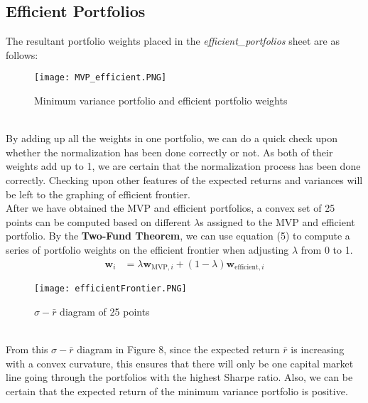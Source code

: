 \subsection{Efficient Portfolios}
The resultant portfolio weights placed in the \emph{efficient\_portfolios} sheet are as follows:
\begin{figure}[h]
	\centering
	\texttt{[image: MVP\_efficient.PNG]}
	\caption{Minimum variance portfolio and efficient portfolio weights}
\end{figure}
\\[6mm]By adding up all the weights in one portfolio, we can do a quick check upon whether the normalization has been done correctly or not. As both of their weights add up to 1, we are certain that the normalization process has been done correctly. Checking upon other features of the expected returns and variances will be left to the graphing of efficient frontier.\\
After we have obtained the MVP and efficient portfolios, a convex set of 25 points can be computed based on different $\lambda$s assigned to the MVP and efficient portfolio. By the \textbf{Two-Fund Theorem}, we can use equation (5) to compute a series of portfolio weights on the efficient frontier when adjusting $\lambda$ from 0 to 1.
\begin{equation}
\begin{split}
\textbf{w}_{i} &= \lambda \textbf{w}_{\text{MVP}, i} + (1 - \lambda) \textbf{w}_{\text{efficient}, i}
\end{split}
\end{equation}
\begin{figure}[h]
	\centering
	\texttt{[image: efficientFrontier.PNG]}
	\caption{$\sigma-\bar{r}$ diagram of 25 points}
\end{figure}
\\From this $\sigma-\bar{r}$ diagram in Figure 8, since the expected return $\bar{r}$ is increasing with a convex curvature, this ensures that there will only be one capital market line going through the portfolios with the highest Sharpe ratio. Also, we can be certain that the expected return of the minimum variance portfolio is positive.
\newpage

